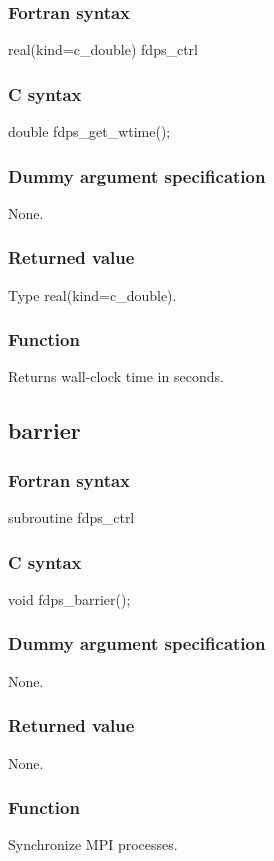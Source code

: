 \subsubsection*{Fortran syntax}
\begin{screen}
\begin{spverbatim}
real(kind=c_double) fdps_ctrl%
\end{spverbatim}
\end{screen}

\subsubsection*{C syntax}
\begin{screen}
\begin{spverbatim}
double fdps_get_wtime();
\end{spverbatim}
\end{screen}

\subsubsection*{Dummy argument specification}
None.

\subsubsection*{Returned value}
Type real(kind=c\_double).

\subsubsection*{Function}
Returns wall-clock time in seconds. 
\clearpage

\subsection{barrier}
\subsubsection*{Fortran syntax}
\begin{screen}
\begin{spverbatim}
subroutine fdps_ctrl%
\end{spverbatim}
\end{screen}

\subsubsection*{C syntax}
\begin{screen}
\begin{spverbatim}
void fdps_barrier();
\end{spverbatim}
\end{screen}

\subsubsection*{Dummy argument specification}
None.

\subsubsection*{Returned value}
None.

\subsubsection*{Function}
Synchronize MPI processes.
